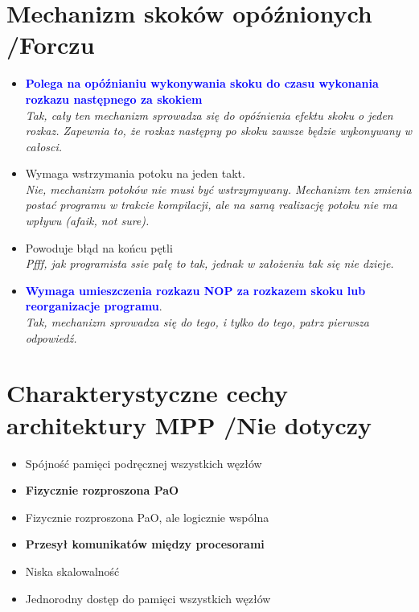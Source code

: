 \section{Mechanizm skoków opóźnionych {\small /Forczu}}
	\begin{itemize}
    \item \textcolor{Blue}{\textbf{Polega na opóźnianiu wykonywania skoku do czasu wykonania rozkazu następnego za skokiem}}\\
    {\small \emph{Tak, cały ten mechanizm sprowadza się do opóźnienia efektu skoku o jeden rozkaz. Zapewnia to, że rozkaz następny po skoku zawsze będzie wykonywany w całosci.}}
    \item Wymaga wstrzymania potoku na jeden takt.\\
    {\small \emph{Nie, mechanizm potoków nie musi być wstrzymywany. Mechanizm ten zmienia postać programu w trakcie kompilacji, ale na samą realizację potoku nie ma wpływu (afaik, not sure).}}
    \item Powoduje błąd na końcu pętli\\
    {\small \emph{Pfff, jak programista ssie pałę to tak, jednak w założeniu tak się nie dzieje.}}
    \item \textcolor{Blue}{\textbf{Wymaga umieszczenia rozkazu NOP za rozkazem skoku lub reorganizacje programu}}.\\
    {\small \emph{Tak, mechanizm sprowadza się do tego, i tylko do tego, patrz pierwsza odpowiedź.}}
    \end{itemize}
    
\section{Charakterystyczne cechy architektury MPP {\small /Nie dotyczy}}
	\begin{itemize}
    \item Spójność pamięci podręcznej wszystkich węzłów
    \item \textbf{Fizycznie rozproszona PaO}
    \item Fizycznie rozproszona PaO, ale logicznie wspólna
    \item \textbf{Przesył komunikatów między procesorami}
    \item Niska skalowalność
    \item Jednorodny dostęp do pamięci wszystkich węzłów
    \end{itemize}

